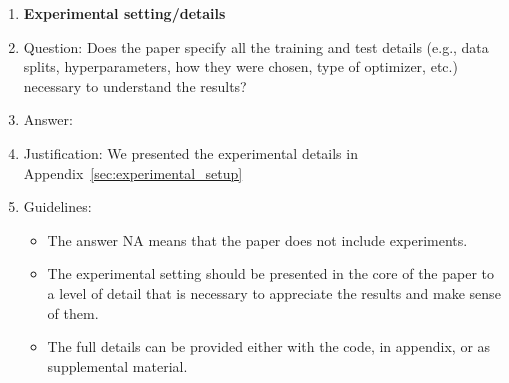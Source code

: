 \begin{enumerate}
\item {\bf Experimental setting/details}
    \item[] Question: Does the paper specify all the training and test details (e.g., data splits, hyperparameters, how they were chosen, type of optimizer, etc.) necessary to understand the results?
    \item[] Answer:\answerYes{} %
    \item[] Justification: We presented the experimental details in Appendix~\ref{sec:experimental_setup} 
    \item[] Guidelines:
    \begin{itemize}
        \item The answer NA means that the paper does not include experiments.
        \item The experimental setting should be presented in the core of the paper to a level of detail that is necessary to appreciate the results and make sense of them.
        \item The full details can be provided either with the code, in appendix, or as supplemental material.
    \end{itemize}


\end{enumerate}
